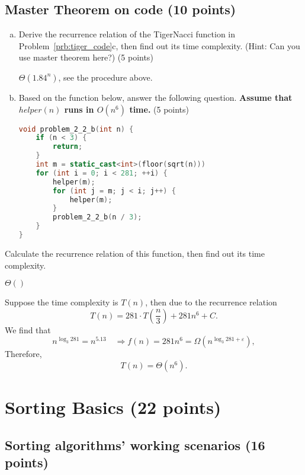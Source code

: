 \documentclass[11pt]{exam}
\begin{document}
\subsection{Master Theorem on code (10 points)}
\begin{enumerate}[(a)]

\item 
Derive the recurrence relation of the TigerNacci function in Problem~\ref{prb:tiger_code}c, then find out its time complexity.
(Hint: Can you use master theorem here?) (5 points)
\begin{solution}
    $\Theta(1.84^n)$, see the procedure above.
\end{solution}

\item 
Based on the function below, answer the following question. \textbf{Assume that $helper(n)$ runs in $O(n^6)$ time.} (5 points)
\begin{lstlisting}[language=c++]
void problem_2_2_b(int n) {
	if (n < 3) {
		return;
	}
	int m = static_cast<int>(floor(sqrt(n)))
	for (int i = 0; i < 281; ++i) {
		helper(m);
		for (int j = m; j < i; j++) {
			helper(m);
		}
		problem_2_2_b(n / 3);
	}
}
\end{lstlisting}
\end{enumerate}
Calculate the recurrence relation of this function, then find out its time complexity.
\begin{solution}
$\Theta()$
\par 
Suppose the time complexity is $T(n)$, then due to the recurrence relation
$$
T(n) = 281 \cdot T\left(\frac{n}{3}\right) + 281 n ^6 + C.
$$
We find that 
$$
n ^ {\log_3 281} = n^{5.13} \quad \Rightarrow f(n) = 281 n^6 = \Omega(n ^{\log_3 281 + \varepsilon}),
$$
Therefore,
$$
T(n) = \Theta(n^6).
$$
\end{solution}


\section{Sorting Basics (22 points)}

\subsection{Sorting algorithms' working scenarios (16 points)}
\end{document}
